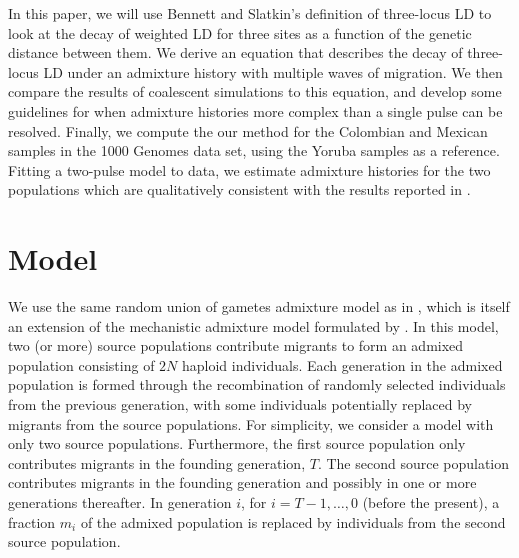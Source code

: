 In this paper, we will use Bennett and Slatkin's definition of three-locus LD to look at the decay of weighted LD for three sites as a function of the genetic distance between them. We derive an equation that describes the decay of three-locus LD under an admixture history with multiple waves of migration. We then compare the results of coalescent simulations to this equation, and develop some guidelines for when admixture histories more complex than a single pulse can be resolved. Finally, we compute the our method for the Colombian and Mexican samples in the 1000 Genomes data set, using the Yoruba samples as a reference. Fitting a two-pulse model to data, we estimate admixture histories for the two populations which are qualitatively consistent with the results reported in \cite{gravel2013reconstructing}. 

\section{Model}
We use the same random union of gametes admixture model as in \cite{liang2014understanding}, which is itself an extension of the mechanistic admixture model formulated by \cite{verdu2011general}. In this model, two (or more) source populations contribute migrants to form an admixed population consisting of $2N$ haploid individuals. Each generation in the admixed population is formed through the recombination of randomly selected individuals from the previous generation, with some individuals potentially replaced by migrants from the source populations. For simplicity, we consider a model with only two source populations. Furthermore, the first source population only contributes migrants in the founding generation, $T$. The second source population contributes migrants in the founding generation and possibly in one or more generations thereafter. In generation $i$, for $i=T-1,\dots,0$ (before the present), a fraction $m_i$ of the admixed population is replaced by individuals from the second source population.
 
